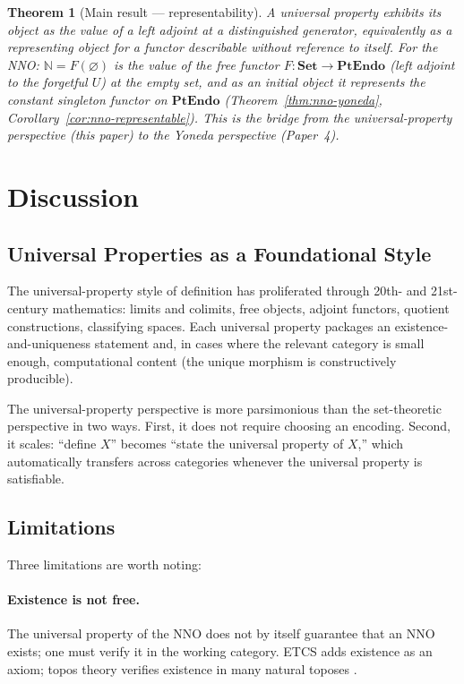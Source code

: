 \documentclass[12pt]{article}
\newtheorem{theorem}{Theorem}[section]
\theoremstyle{definition}
\theoremstyle{remark}
\newcommand{\N}{\mathbb{N}}
\newcommand{\Set}{\mathbf{Set}}
\newcommand{\PtEndo}{\mathbf{PtEndo}}
\begin{document}
\begin{theorem}[Main result --- representability]
\label{thm:main-representability}
A universal property exhibits its object as the value of a left adjoint at a distinguished generator, equivalently as a representing object for a functor describable without reference to itself. For the NNO: $\N = F(\varnothing)$ is the value of the free functor $F \colon \Set \to \PtEndo$ (left adjoint to the forgetful $U$) at the empty set, and as an initial object it represents the constant singleton functor on $\PtEndo$ (Theorem~\ref{thm:nno-yoneda}, Corollary~\ref{cor:nno-representable}). This is the bridge from the universal-property perspective (this paper) to the Yoneda perspective (Paper~4).
\end{theorem}

\section{Discussion}
\label{sec:discussion}

\subsection{Universal Properties as a Foundational Style}

The universal-property style of definition has proliferated through 20th- and 21st-century mathematics: limits and colimits, free objects, adjoint functors, quotient constructions, classifying spaces. Each universal property packages an existence-and-uniqueness statement and, in cases where the relevant category is small enough, computational content (the unique morphism is constructively producible).

The universal-property perspective is more parsimonious than the set-theoretic perspective in two ways. First, it does not require choosing an encoding. Second, it scales: ``define $X$'' becomes ``state the universal property of $X$,'' which automatically transfers across categories whenever the universal property is satisfiable.

\subsection{Limitations}

Three limitations are worth noting:

\paragraph{Existence is not free.} The universal property of the NNO does not by itself guarantee that an NNO exists; one must verify it in the working category. ETCS adds existence as an axiom; topos theory verifies existence in many natural toposes \cite{Lawvere1964,MaclaneMoerdijk1992}.
\end{document}
